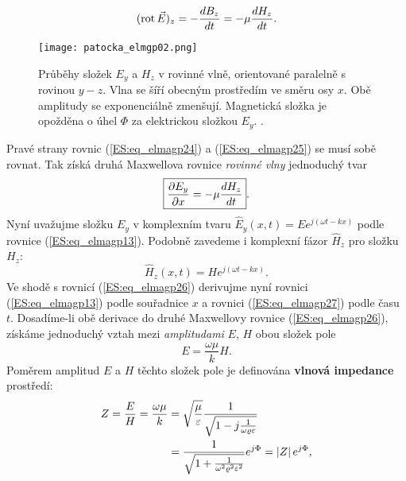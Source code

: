 {        \begin{equation}\label{ES:eq_elmagp25}
          (\text{rot}\,\vec{E})_z = - \dfrac{d B_z}{d t} = -\mu\dfrac{d H_z}{d t}.
        \end{equation}
        \begin{figure}[ht!]   
          \centering
          \texttt{[image: patocka\_elmgp02.png]}
          \caption{Průběhy složek \(E_y\) a \(H_z\) v rovinné vlně, orientované paralelně s rovinou 
                   \(y-z\). Vlna se šíří obecným prostředím ve směru osy \(x\). Obě amplitudy se 
                   exponenciálně zmenšují. Magnetická složka je opožděna o úhel \(\Phi\) za 
                   elektrickou složkou \(E_y\). \cite[s.~74]{Patocka4}.}
          \label{ES:fig_elmgp02}
        \end{figure}
        Pravé strany rovnic (\ref{ES:eq_elmagp24}) a (\ref{ES:eq_elmagp25}) se musí sobě rovnat. 
        Tak získá druhá Maxwellova rovnice \emph{rovinné vlny} jednoduchý tvar
        \begin{equation}\label{ES:eq_elmagp26}
          \boxed{\dfrac{\partial E_y}{\partial x} = - \mu\dfrac{d H_z}{d t}}.
        \end{equation}
        Nyní uvažujme složku \(E_y\) v komplexním tvaru \(\hat{E}_y(x,t)=Ee^{j(\omega t - kx)}\)  
        podle rovnice (\ref{ES:eq_elmagp13}). Podobně zavedeme i komplexní fázor \(\hat{H}_z\) pro 
        složku \(H_z\):
        \begin{equation}\label{ES:eq_elmagp27}
          \hat{H}_z(x,t)=H e^{j(\omega t - kx)}.
        \end{equation}
        Ve shodě s rovnicí (\ref{ES:eq_elmagp26}) derivujme nyní rovnici (\ref{ES:eq_elmagp13}) 
        podle souřadnice \(x\) a rovnici (\ref{ES:eq_elmagp27}) podle času \(t\). Dosadíme-li obě 
        derivace do druhé Maxwellovy rovnice (\ref{ES:eq_elmagp26}), získáme jednoduchý vztah mezi 
        \emph{amplitudami} \(E\), \(H\) obou složek pole
        \begin{equation}\label{ES:eq_elmagp28}
          E = \frac{\omega\mu}{k}H.
        \end{equation}
        Poměrem amplitud \(E\) a \(H\) těchto složek pole je definována \textbf{vlnová impedance} 
        prostředí:
        \begin{align} \label{ES:eq_elmagp29}
          Z  = \frac{E}{H} = \frac{\omega\mu}{k}
            &= \sqrt{\dfrac{\mu}{\varepsilon}}
               \frac{1}{\sqrt{1-j\frac{1}{\omega\varrho\varepsilon}}}                 \nonumber \\
            &= \frac{1}{\sqrt{1+\frac{1}{\omega^2\varrho^2\varepsilon^2}}}e^{j\Phi}
             = \left\lvert Z\right\rvert e^{j\Phi},
        \end{align}

}
